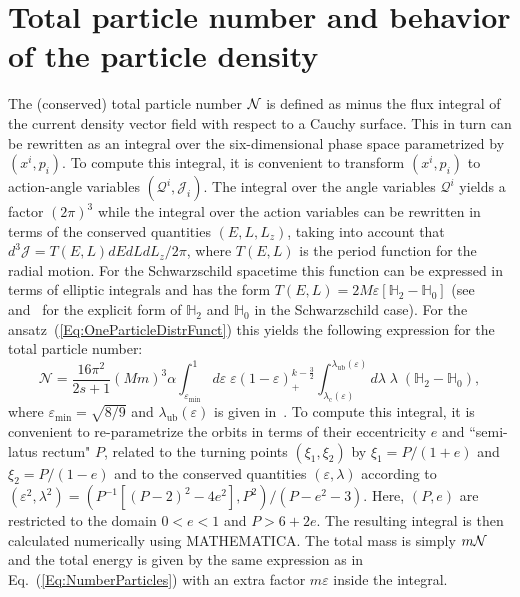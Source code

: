 \documentclass{appolb}
\begin{document}
\section{Total particle number and behavior of the particle density}
\label{Sec:Mass}

The (conserved) total particle number ${\cal N}$ is defined as minus the flux integral of the current density vector field with respect to a Cauchy surface. This in turn can be rewritten as an integral over the six-dimensional phase space parametrized by $(x^i,p_i)$. To compute this integral, it is convenient to transform $(x^i,p_i)$ to action-angle variables $(\mathcal{Q}^i,\mathcal{J}_i)$. The integral over the angle variables $\mathcal{Q}^i$ yields a factor $(2\pi)^3$ while the integral over the action variables can be rewritten in terms of the conserved quantities $(E,L,L_z)$, taking into account that $d^3\mathcal{J} = T(E,L) dE dL dL_z /2\pi$, where $T(E,L)$ is the period function for the radial motion. For the Schwarzschild spacetime this function can be expressed in terms of elliptic integrals and has the form $T(E,L) = 2 M \varepsilon \left[ \mathbb{H}_2 - \mathbb{H}_0 \right]$ (see~\cite[Appendix A]{pRoS18a} and~\cite{cGoS2021b} for the explicit form of $\mathbb{H}_2$ and $\mathbb{H}_0$ in the Schwarzschild case). For the ansatz~(\ref{Eq:OneParticleDistrFunct}) this yields the following expression for the total particle number:
\begin{equation}
\label{Eq:NumberParticles}
\mathcal{N} = \frac{16\pi^2}{2s+1}(M m)^3 \alpha \int_{\varepsilon_{\text{min}}}^1 d\varepsilon \; \varepsilon \left(1-\varepsilon \right)^{k-\frac{3}{2}}_+ 
\int_{\lambda_{\text{c}}(\varepsilon)}^{\lambda_{\text{ub}}(\varepsilon)} 
d\lambda\; \lambda \; (\mathbb{H}_2-\mathbb{H}_0),
\end{equation}
where $\varepsilon_{\text{min}} = \sqrt{8/9}$ and $\lambda_{\text{ub}}(\varepsilon)$ is given in~\cite[Appendix A]{pRoS16}. To compute this integral, it is convenient to re-parametrize the orbits in terms of their eccentricity $e$ and ``semi-latus rectum" $P$, related to the turning points $(\xi_1,\xi_2)$ by $\xi_1 = P/(1+e)$ and $\xi_2 = P/(1-e)$ and to the conserved quantities $(\varepsilon,\lambda)$ according to~\cite{wS02,jBmGtH15,pRoS18a,cGoS2021b} $(\varepsilon^2,\lambda^2) = ( P^{-1}[(P-2)^2 - 4e^2], P^2)/(P - e^2 -3)$. Here, $(P,e)$ are restricted to the domain $0 < e < 1$ and $P > 6 + 2e$. The resulting integral is then calculated numerically using MATHEMATICA. The total mass is simply $m{\cal N}$ and the total energy is given by the same expression as in Eq.~(\ref{Eq:NumberParticles}) with an extra factor $m\varepsilon$ inside the integral.
\end{document}
